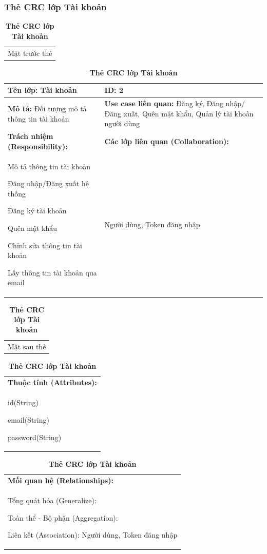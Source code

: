   \subsubsection{Thẻ CRC lớp Tài khoản}
  \begin{table}[H]
    \caption{\bfseries \fontsize{12pt}{0pt}\selectfont Thẻ CRC lớp Tài khoản}
    \centering
    \begin{tabularx}{0.9\textwidth}{X}
      Mặt trước thẻ
    \end{tabularx}
    \begin{tabularx}{0.9\textwidth}{|X|X|}
      \hline
      \textbf{Tên lớp:} Tài khoản & \textbf{ID:} 2 \\
      \hline
      \textbf{Mô tả:} Đối tượng mô tả thông tin tài khoản & \textbf{Use case liên quan:} Đăng ký, Đăng nhập/Đăng xuất, Quên mật khẩu, Quản lý tài khoản người dùng \\
      \hline
      \textbf{Trách nhiệm (Responsibility):} & \textbf{Các lớp liên quan (Collaboration):} \\
      Mô tả thông tin tài khoản
      
      Đăng nhập/Đăng xuất hệ thống

      Đăng ký tài khoản

      Quên mật khẩu

      Chỉnh sửa thông tin tài khoản

      Lấy thông tin tài khoản qua email
      & 
      Người dùng, Token đăng nhập
      \\
      \hline
    \end{tabularx}
    \begin{tabularx}{0.9\textwidth}{X}
      Mặt sau thẻ
    \end{tabularx}
    \begin{tabularx}{0.9\textwidth}{|X|}
      \hline
      \textbf{Thuộc tính (Attributes):} \\
      id(String) 
      
      email(String)

      password(String)
      \\
      \hline
    \end{tabularx}
    \begin{tabularx}{0.9\textwidth}{|X|}
      \textbf{Mối quan hệ (Relationships):} \\
      Tổng quát hóa (Generalize):  

      Toàn thể - Bộ phận (Aggregation):   
      
      Liên kết (Association): Người dùng, Token đăng nhập 
      \\
      \hline
    \end{tabularx}
  \end{table}

